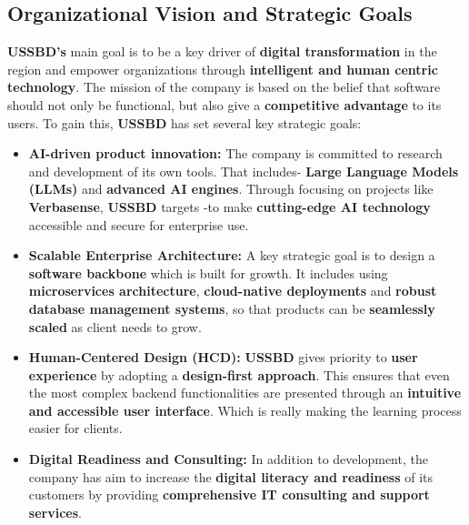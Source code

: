 \documentclass[oneside]{thesis-library}
\begin{document}
\subsection{Organizational Vision and Strategic Goals}
\textbf{USSBD's} main goal is to be a key driver of \textbf{digital transformation} in the region and empower organizations through \textbf{intelligent and human centric technology}. The mission of the company is based on the belief that software should not only be functional, but also give a \textbf{competitive advantage} to its users. To gain this, \textbf{USSBD} has set several key strategic goals:
\begin{itemize}
    \item \textbf{AI-driven product innovation:} The company is committed to research and development of its own tools. That includes- \textbf{Large Language Models (LLMs)} and \textbf{advanced AI engines}. Through focusing on projects like \textbf{Verbasense}, \textbf{USSBD} targets -to make \textbf{cutting-edge AI technology} accessible and secure for enterprise use.
    \item \textbf{Scalable Enterprise Architecture:} A key strategic goal is to design a \textbf{software backbone} which is built for growth. It includes using \textbf{microservices architecture}, \textbf{cloud-native deployments} and \textbf{robust database management systems}, so that products can be \textbf{seamlessly scaled} as client needs to grow.
    \item \textbf{Human-Centered Design (HCD):} \textbf{USSBD} gives priority to \textbf{user experience} by adopting a \textbf{design-first approach}. This ensures that even the most complex backend functionalities are presented through an \textbf{intuitive and accessible user interface}. Which is really making the learning process easier for clients.
    \item \textbf{Digital Readiness and Consulting:} In addition to development, the company has aim to increase the \textbf{digital literacy and readiness} of its customers by providing \textbf{comprehensive IT consulting and support services}.
\end{itemize}
\end{document}
